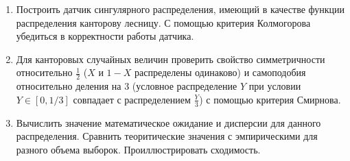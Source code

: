 \begin{enumerate}
	\item Построить датчик сингулярного распределения, имеющий в качестве функции
     распределения канторову лесницу. С помощью критерия Колмогорова убедиться в
     корректности работы датчика.
	\item Для канторовых случайных величин проверить свойство симметричности
     относительно $\frac{1}{2}$ ($X$ и $1 - X$ распределены одинаково) и самоподобия
     относительно деления на 3 (условное распределение $Y$ при условии
     $Y \in [0, 1/3]$ совпадает с распределением $\frac{Y}{3}$) с помощью критерия
     Смирнова.
	\item Вычислить значение математическое ожидание и дисперсии для данного
     распределения. Сравнить теоритические значения с эмпирическими для разного объема
     выборок. Проиллюстрировать сходимость.
\end{enumerate}

